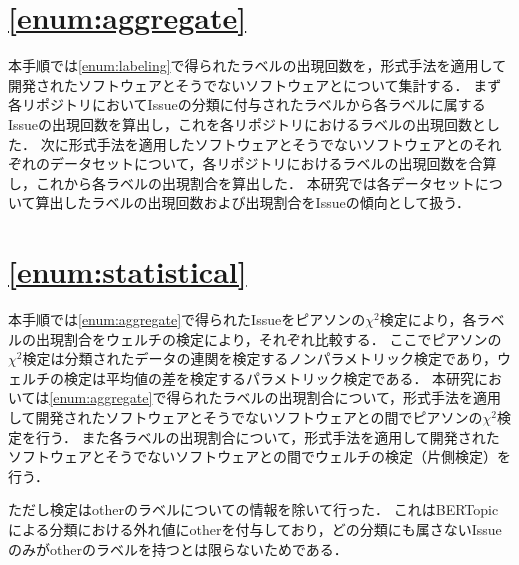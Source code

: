 \documentclass[main]{subfiles}
\begin{document}
\section{\ref{enum:aggregate}}
\label{sec:aggregate}

本手順では\ref{enum:labeling}で得られたラベルの出現回数を，形式手法を適用して開発されたソフトウェアとそうでないソフトウェアとについて集計する．
まず各リポジトリにおいてIssueの分類に付与されたラベルから各ラベルに属するIssueの出現回数を算出し，これを各リポジトリにおけるラベルの出現回数とした．
次に形式手法を適用したソフトウェアとそうでないソフトウェアとのそれぞれのデータセットについて，各リポジトリにおけるラベルの出現回数を合算し，これから各ラベルの出現割合を算出した．
本研究では各データセットについて算出したラベルの出現回数および出現割合をIssueの傾向として扱う．


\section{\ref{enum:statistical}}
\label{sec:statistical}

本手順では\ref{enum:aggregate}で得られたIssueをピアソンの\(\chi^2\)検定により，各ラベルの出現割合をウェルチの検定により，それぞれ比較する．
ここでピアソンの\(\chi^2\)検定は分類されたデータの連関を検定するノンパラメトリック検定であり，ウェルチの検定は平均値の差を検定するパラメトリック検定である．
本研究においては\ref{enum:aggregate}で得られたラベルの出現割合について，形式手法を適用して開発されたソフトウェアとそうでないソフトウェアとの間でピアソンの\(\chi^2\)検定を行う．
また各ラベルの出現割合について，形式手法を適用して開発されたソフトウェアとそうでないソフトウェアとの間でウェルチの検定（片側検定）を行う．

ただし検定はotherのラベルについての情報を除いて行った．
これはBERTopicによる分類における外れ値にotherを付与しており，どの分類にも属さないIssueのみがotherのラベルを持つとは限らないためである．
\end{document}
